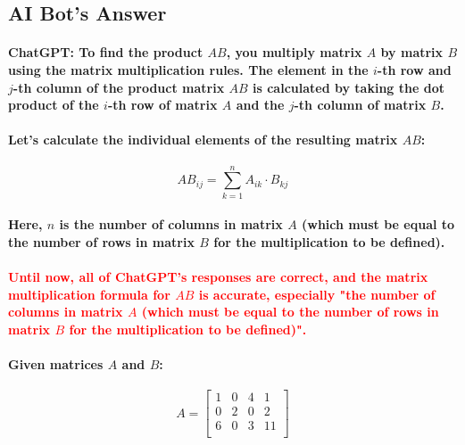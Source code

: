 \documentclass[11pt]{article} %
\begin{document}
\subsection{AI Bot's Answer}
\begin{mdframed}[
        backgroundcolor=white,  %
        linecolor=black,        %
        leftmargin=5pt,         %
        rightmargin=5pt,        %
        linewidth=2pt           %
    ]
    \paragraph{\textbf{ChatGPT}: To find the product \(AB\), you multiply matrix \(A\) by matrix \(B\) using the matrix multiplication rules. The element in the \(i\)-th row and \(j\)-th column of the product matrix \(AB\) is calculated by taking the dot product of the \(i\)-th row of matrix \(A\) and the \(j\)-th column of matrix \(B\).}
    \paragraph{Let's calculate the individual elements of the resulting matrix \(AB\):}
    \[ AB_{ij} = \sum_{k=1}^{n} A_{ik} \cdot B_{kj} \]
    \paragraph{Here, \(n\) is the number of columns in matrix \(A\) (which must be equal to the number of rows in matrix \(B\) for the multiplication to be defined).}
    \paragraph{\textcolor{red}{Until now, all of ChatGPT's responses are correct, and the matrix multiplication formula for \(AB\) is accurate, especially "the number of columns in matrix \(A\) (which must be equal to the number of rows in matrix \(B\) for the multiplication to be defined)".}}
    \paragraph{Given matrices \(A\) and \(B\):}
    \[ A = \begin{bmatrix}
            1 & 0 & 4 & 1  \\
            0 & 2 & 0 & 2  \\
            6 & 0 & 3 & 11 \\
        \end{bmatrix} \]


\end{mdframed}
\end{document}
